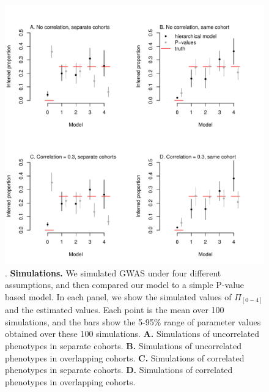 \documentclass[11pt,titlepage]{article}
\begin{document}
\begin{figure}
\begin{center}
\includegraphics[scale = 0.6]{figs/sims.pdf}
\caption{. \textbf{Simulations.} We simulated GWAS under four different assumptions, and then compared our model to a simple P-value based model. In each panel, we show the simulated values of $\Pi_{[0-4]}$ and the estimated values. Each point is the mean over 100 simulations, and the bars show the 5-95\% range of parameter values obtained over these 100 simulations. \textbf{A.} Simulations of uncorrelated phenotypes in separate cohorts. \textbf{B.} Simulations of uncorrelated phenotypes in overlapping cohorts. \textbf{C.} Simulations of correlated phenotypes in separate cohorts. \textbf{D.} Simulations of correlated phenotypes in overlapping cohorts.}\label{f_sim}
\end{center}
\end{figure}
\end{document}
